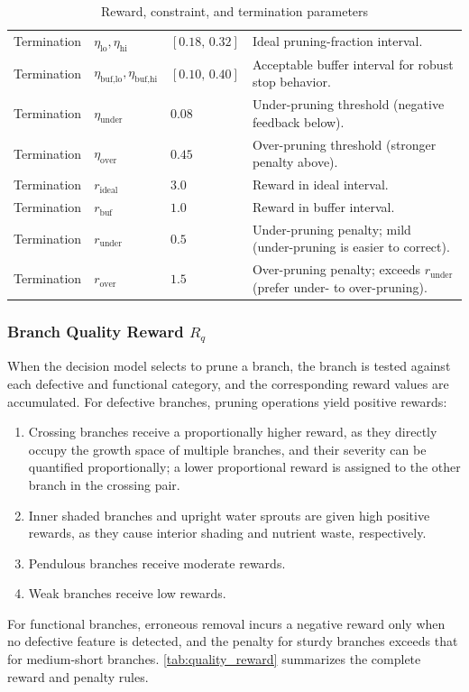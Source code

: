 \documentclass[12pt,a4paper,fontset=fandol]{ctexart}
\begin{document}
\begin{table}[H]
\begin{tabularx}{\textwidth}{>{\raggedright\arraybackslash}p{2.1cm}>{\raggedright\arraybackslash}p{2.7cm}>{\raggedright\arraybackslash}p{1.9cm}>{\raggedright\arraybackslash}X}
Termination & $\eta_{\text{lo}},\eta_{\text{hi}}$ & $[0.18,\,0.32]$ & Ideal pruning-fraction interval. \\
Termination & $\eta_{\text{buf,lo}},\eta_{\text{buf,hi}}$ & $[0.10,\,0.40]$ & Acceptable buffer interval for robust stop behavior. \\
Termination & $\eta_{\text{under}}$ & $0.08$ & Under-pruning threshold (negative feedback below). \\
Termination & $\eta_{\text{over}}$ & $0.45$ & Over-pruning threshold (stronger penalty above). \\
Termination & $r_{\text{ideal}}$ & $3.0$ & Reward in ideal interval. \\
Termination & $r_{\text{buf}}$ & $1.0$ & Reward in buffer interval. \\
Termination & $r_{\text{under}}$ & $0.5$ & Under-pruning penalty; mild (under-pruning is easier to correct). \\
Termination & $r_{\text{over}}$ & $1.5$ & Over-pruning penalty; exceeds $r_{\text{under}}$ (prefer under- to over-pruning). \\
\bottomrule
\end{tabularx}
\caption{Reward, constraint, and termination parameters}
\label{tab:param_reward}
\end{table}



\subsubsection{Branch Quality Reward $R_q$}

When the decision model selects to prune a branch, the branch is tested against each defective and functional category, and the corresponding reward values are accumulated. For defective branches, pruning operations yield positive rewards:
\begin{enumerate}[label=(\arabic*),leftmargin=2.2em,itemsep=2pt,topsep=2pt,parsep=0pt]
\item Crossing branches receive a proportionally higher reward, as they directly occupy the growth space of multiple branches, and their severity can be quantified proportionally; a lower proportional reward is assigned to the other branch in the crossing pair.
\item Inner shaded branches and upright water sprouts are given high positive rewards, as they cause interior shading and nutrient waste, respectively.
\item Pendulous branches receive moderate rewards.
\item Weak branches receive low rewards.
\end{enumerate}
For functional branches, erroneous removal incurs a negative reward only when no defective feature is detected, and the penalty for sturdy branches exceeds that for medium-short branches. \cref{tab:quality_reward} summarizes the complete reward and penalty rules.
\end{document}
